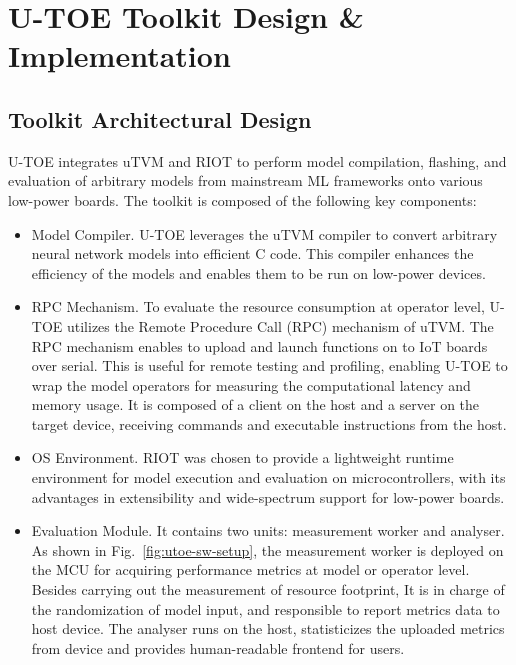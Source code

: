 \section{U-TOE Toolkit Design \& Implementation}

\subsection{Toolkit Architectural Design}
U-TOE integrates uTVM and RIOT to perform model compilation, flashing, and evaluation of arbitrary models from mainstream ML frameworks onto various low-power boards. The toolkit is composed of the following key components:
\begin{itemize}
    \item Model Compiler. U-TOE leverages the uTVM compiler to convert arbitrary neural network models into efficient C code. This compiler enhances the efficiency of the models and enables them to be run on low-power devices.

    \item RPC Mechanism. To evaluate the resource consumption at operator level, U-TOE utilizes the Remote Procedure Call (RPC) mechanism of uTVM. The RPC mechanism enables to upload and launch functions on to IoT boards over serial. This is useful for remote testing and profiling, enabling U-TOE to wrap the model operators for measuring the computational latency and memory usage. It is composed of a client on the host and a server on the target device, receiving commands and executable instructions from the host.

    \item OS Environment. RIOT was chosen to provide a lightweight runtime environment for model execution and evaluation on microcontrollers, with its advantages in extensibility and wide-spectrum support for low-power boards.

    \item Evaluation Module. It contains two units: measurement worker and analyser. As shown in Fig.~\ref{fig:utoe-sw-setup}, the measurement worker is deployed on the MCU for acquiring performance metrics at model or operator level. Besides carrying out the measurement of resource footprint, It is in charge of the randomization of model input, and responsible to report metrics data to host device. The analyser runs on the host, statisticizes the uploaded metrics from device and provides human-readable frontend for users. 
\end{itemize}

